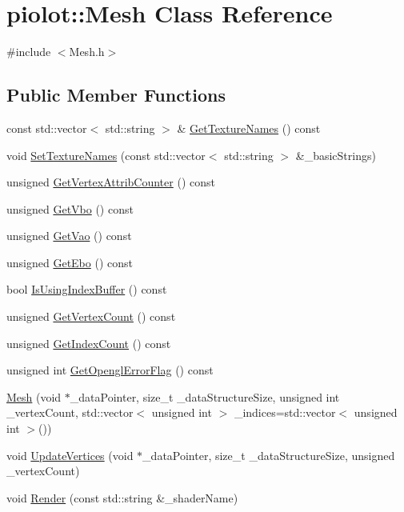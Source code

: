\hypertarget{classpiolot_1_1_mesh}{}\section{piolot\+:\+:Mesh Class Reference}
\label{classpiolot_1_1_mesh}


{\ttfamily \#include $<$Mesh.\+h$>$}

\subsection*{Public Member Functions}
\begin{DoxyCompactItemize}
\item 
const std\+::vector$<$ std\+::string $>$ \& \mbox{\hyperlink{classpiolot_1_1_mesh_a9351991e7afd13a3c121aedc5577cfd9}{Get\+Texture\+Names}} () const
\item 
void \mbox{\hyperlink{classpiolot_1_1_mesh_a5d5f50621cac37966f39e6ee09788949}{Set\+Texture\+Names}} (const std\+::vector$<$ std\+::string $>$ \&\+\_\+basic\+Strings)
\item 
unsigned \mbox{\hyperlink{classpiolot_1_1_mesh_a2864e1da1d187185cebc55790f6d5940}{Get\+Vertex\+Attrib\+Counter}} () const
\item 
unsigned \mbox{\hyperlink{classpiolot_1_1_mesh_a755867d22123118a4b4e00bbf677e987}{Get\+Vbo}} () const
\item 
unsigned \mbox{\hyperlink{classpiolot_1_1_mesh_a8f4122e191086d7f5e95250a80766d82}{Get\+Vao}} () const
\item 
unsigned \mbox{\hyperlink{classpiolot_1_1_mesh_afe44ffdc27bc839ec6139f801e2efae9}{Get\+Ebo}} () const
\item 
bool \mbox{\hyperlink{classpiolot_1_1_mesh_a4336c9ab2304035ab8e2a7fdad9233e7}{Is\+Using\+Index\+Buffer}} () const
\item 
unsigned \mbox{\hyperlink{classpiolot_1_1_mesh_a48f0c3d62435199c10ce0169a079c995}{Get\+Vertex\+Count}} () const
\item 
unsigned \mbox{\hyperlink{classpiolot_1_1_mesh_aaeaf1e4a7ed7fff6c27103393077c6f3}{Get\+Index\+Count}} () const
\item 
unsigned int \mbox{\hyperlink{classpiolot_1_1_mesh_aa0dad39c742e455b1a0fe27731d01737}{Get\+Opengl\+Error\+Flag}} () const
\item 
\mbox{\hyperlink{classpiolot_1_1_mesh_a74d2647106f2fab38f95eb0ab5c678ef}{Mesh}} (void $\ast$\+\_\+data\+Pointer, size\+\_\+t \+\_\+data\+Structure\+Size, unsigned int \+\_\+vertex\+Count, std\+::vector$<$ unsigned int $>$ \+\_\+indices=std\+::vector$<$ unsigned int $>$())
\item 
void \mbox{\hyperlink{classpiolot_1_1_mesh_a55e20241728a050db306a531bf6d6c79}{Update\+Vertices}} (void $\ast$\+\_\+data\+Pointer, size\+\_\+t \+\_\+data\+Structure\+Size, unsigned \+\_\+vertex\+Count)
\item 
void \mbox{\hyperlink{classpiolot_1_1_mesh_ad7d1c1d6b25a58d52c6a126cf25e235e}{Render}} (const std\+::string \&\+\_\+shader\+Name)
\end{DoxyCompactItemize}

